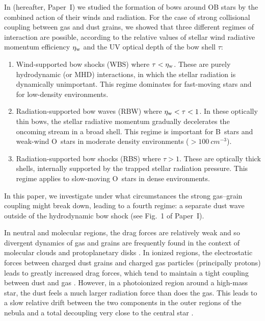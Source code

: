 \documentclass[useAMS, usenatbib, a4paper]{mnras}
\begin{document}
In \citet{Henney:2019a} (hereafter, Paper~I) we studied the formation
of bows around OB stars by the combined action of their winds and
radiation.  For the case of strong collisional coupling between gas
and dust grains, we showed that three different regimes of interaction
are possible, according to the relative values of stellar wind
radiative momentum efficiency \(\eta_{\text{w}}\) and the UV optical depth of
the bow shell \(\tau\):
\begin{enumerate}[{\(\star\)}]
\item Wind-supported bow shocks (WBS) where \(\tau < \eta_{\text{w}}\).  These are
  purely hydrodynamic (or MHD) interactions, in which the stellar
  radiation is dynamically unimportant.  This regime dominates for
  fast-moving stars and for low-density environments.
\item Radiation-supported bow waves (RBW) where
  \(\eta_{\text{w}} < \tau < 1\).  In these optically thin bows, the stellar
  radiative momentum gradually decelerates the oncoming stream in a
  broad shell.  This regime is important for B~stars and weak-wind
  O~stars in moderate density environments (\(> \SI{100}{cm^{-3}}\)).
\item Radiation-supported bow shocks (RBS) where \(\tau > 1\).  These are
  optically thick shells, internally supported by the trapped stellar
  radiation pressure.  This regime applies to slow-moving O~stars in
  dense environments.
\end{enumerate}
In this paper, we investigate under what circumstances the strong
gas--grain coupling might break down, leading to a fourth regime: a
separate dust wave outside of the hydrodynamic bow shock (see Fig.~1
of Paper~I).

In neutral and molecular regions, the drag forces are relatively weak
and so divergent dynamics of gas and grains are frequently found in
the context of molecular clouds \citetext{\citealp{Hopkins:2016a,
    Lee:2017a, Mattsson:2019a}, but see \citealp{Tricco:2017a}} and
protoplanetary disks \citep{Weidenschilling:1977b, Birnstiel:2010a,
  Dipierro:2018a}.  In ionized regions, the electrostatic forces
between charged dust grains and charged gas particles (principally
protons) leads to greatly increased drag forces, which tend to
maintain a tight coupling between dust and gas \citep{Draine:2011a}.
However, in a photoionized \hii{} region around a high-mass star, the
dust feels a much larger radiation force than does the gas. This leads
to a slow relative drift between the two components in the outer
regions of the nebula \citep{Gail:1979a, Akimkin:2015a, Akimkin:2017a,
  Ishiki:2018a} and a total decoupling very close to the central star
\citep[Fig.~8 of][]{Draine:2011a}.
\end{document}
